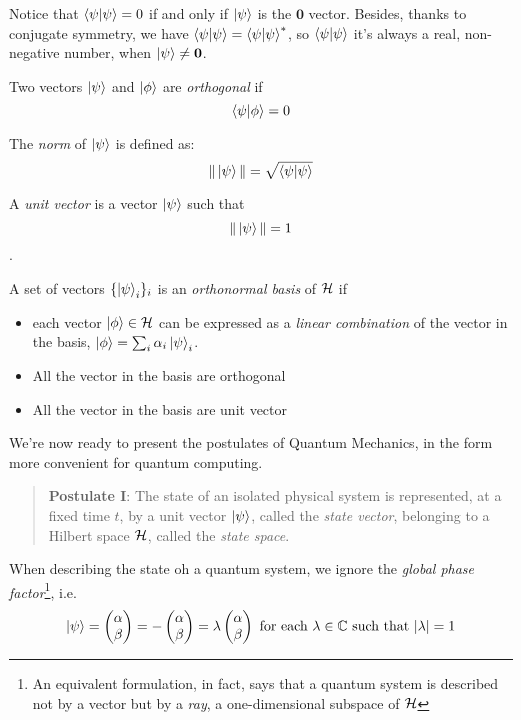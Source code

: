 Notice that $\braket{\psi|\psi} = 0$ if and only if $\ket{\psi}$ is the $\mathbf{0}$ vector. Besides, thanks to conjugate symmetry, we have $\braket{\psi | \psi} = \braket{\psi | \psi} ^ *$, so $\braket{\psi | \psi}$ it's always a real, non-negative number, when $\ket{\psi} \neq \mathbf{0}$.

Two vectors $\ket{\psi}$ and $\ket{\phi}$ are \textit{orthogonal} if
 \[\braket{\psi | \phi} = 0\]


The \textit{norm} of $\ket{\psi}$ is defined as: 
\[ \|\ket{\psi}\| = \sqrt{\braket{\psi|\psi}}\]


A \textit{unit vector} is a vector $\ket{\psi}$ such that \[\|\ket{\psi}\| = 1\].

A set of vectors $\{\ket{\psi}_i\}_i$ is an \textit{orthonormal basis} of $\mathcal{H}$ if \begin{itemize}
	\item each vector $\ket{\phi} \in \mathcal{H}$ can be expressed as a \textit{linear combination} of the vector in the basis, $\ket{\phi} = \sum_i \alpha_i\ket{\psi}_i$.
	\item All the vector in the basis are orthogonal
	\item All the vector in the basis are unit vector 
\end{itemize}

We're now ready to present the postulates of Quantum Mechanics, in the form more convenient for quantum computing.

\begin{quote} 
\textbf{Postulate I}: The state of an isolated physical system is represented, at a fixed time $t$, by a unit vector $\ket{\psi}$, called the \textit{state vector}, belonging to a Hilbert space $\mathcal{H}$, called the \textit{state space}. 
\end{quote}

 When describing the state oh a quantum system, we ignore the \textit{global phase factor}\footnote{An equivalent formulation, in fact, says that a quantum system is described not by a vector but by a \textit{ray}, a one-dimensional subspace of $\mathcal{H}$}, i.e. 
 \[
 	\ket{\psi} = \begin{pmatrix}
	\alpha \\
	\beta
	\end{pmatrix} = - \begin{pmatrix}
	\alpha \\
	\beta
	\end{pmatrix} = \lambda \begin{pmatrix}
	\alpha \\
	\beta
	\end{pmatrix} 
	\text{ for each $\lambda \in \mathbb{C}$  such that $|\lambda| = 1$}
 \]

